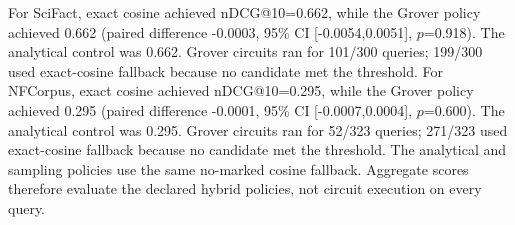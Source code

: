 For SciFact, exact cosine achieved nDCG@10=0.662, while the Grover policy achieved 0.662 (paired difference -0.0003, 95\% CI [-0.0054,0.0051], $p$=0.918). The analytical control was 0.662. Grover circuits ran for 101/300 queries; 199/300 used exact-cosine fallback because no candidate met the threshold. For NFCorpus, exact cosine achieved nDCG@10=0.295, while the Grover policy achieved 0.295 (paired difference -0.0001, 95\% CI [-0.0007,0.0004], $p$=0.600). The analytical control was 0.295. Grover circuits ran for 52/323 queries; 271/323 used exact-cosine fallback because no candidate met the threshold. The analytical and sampling policies use the same no-marked cosine fallback. Aggregate scores therefore evaluate the declared hybrid policies, not circuit execution on every query.
